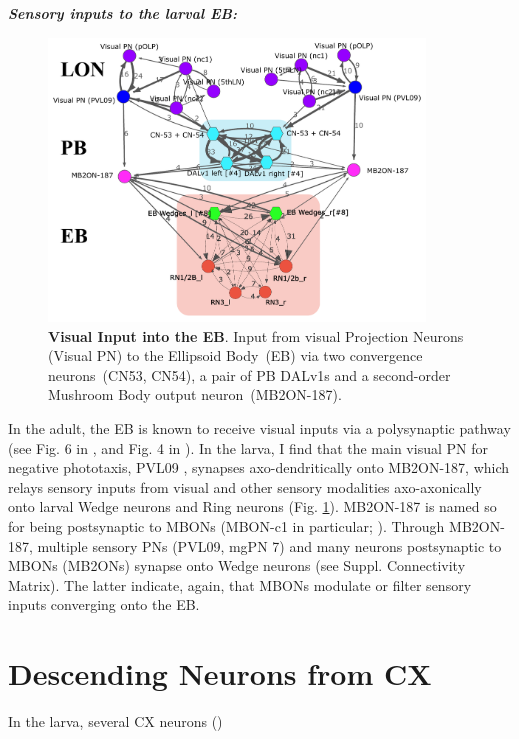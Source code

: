         \textbf{\textit{Sensory inputs to the larval EB:}}
        \begin{figure}
            \centering
            \includegraphics[width=10cm]{Figs/CX/visualPNstoPBEB.pdf}
            \caption{\textbf{Visual Input into the EB}. Input from visual Projection Neurons (Visual PN) to the Ellipsoid Body~(EB) via two convergence neurons~(CN53, CN54), a pair of PB DALv1s and a second-order Mushroom Body output neuron~(MB2ON-187).}
            \label{visualPBEB}
        \end{figure}
        
    In the adult, the EB is known to receive visual inputs via a polysynaptic pathway (see Fig. 6 in \citep{hulse2021connectome}, and Fig. 4 in \citep{omoto2018neuronal}). In the larva, I find that the main visual PN for negative phototaxis, PVL09 \citep{Humberg2018PVL09}, synapses axo-dendritically onto MB2ON-187, which relays sensory inputs from visual and other sensory modalities axo-axonically onto larval Wedge neurons and Ring neurons (Fig. \ref{visualPBEB}).
    MB2ON-187 is named so for being postsynaptic to MBONs (MBON-c1 in particular; \citep{eschbach2021circuits}).
    Through MB2ON-187, multiple sensory PNs (PVL09, mgPN 7) and many neurons postsynaptic to MBONs (MB2ONs) synapse onto Wedge neurons (see Suppl. Connectivity Matrix).
    The latter indicate, again, that MBONs modulate or filter sensory inputs converging onto the EB.

 \section{Descending Neurons from CX}    

    In the larva, several CX neurons ()


